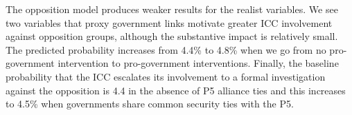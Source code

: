 The opposition model produces weaker results for the realist variables. We see two variables that proxy government links motivate greater ICC involvement against opposition groups, although the substantive impact is relatively small. The predicted probability increases from 4.4\% to 4.8\% when we go from no pro-government intervention to pro-government interventions. Finally, the baseline probability that the ICC escalates its involvement to a formal investigation against the opposition is 4.4 in the absence of P5 alliance ties and this increases to 4.5\% when governments share common security ties with the P5.
